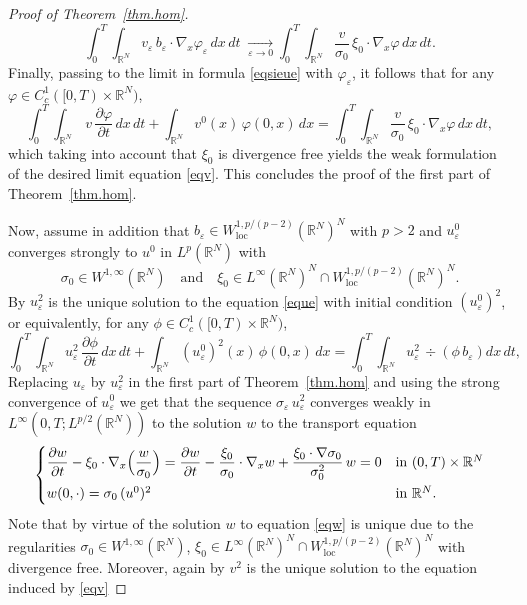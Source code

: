 \documentclass[11pt]{article}
\newcommand{\loc}{\mathrm{loc}}
\let \ph \varphi
\def \RR {\mathbb R}
\theoremstyle{plain}
\theoremstyle{definition}
\numberwithin{equation}{section}
\begin{document}
\begin{proof}[Proof of Theorem~\ref{thm.hom}]
\[
\int_0^T\!\!\int_{\RR^N}v_\varepsilon\,b_\varepsilon\cdot\nabla_x\ph_\varepsilon\,dx\,dt\;\xrightarrow[\varepsilon\to 0]\;
\int_0^T\!\!\int_{\RR^N}\dfrac{v}{\sigma_0}\,\xi_0\cdot\nabla_x\ph\,dx\,dt.
\]
Finally, passing to the limit in formula \eqref{eqsieue} with $\ph_\varepsilon$, it follows that for any $\ph\in C^1_c([0,T)\times\RR^N)$,
\[
\int_0^T\!\!\int_{\RR^N}\,v\, \dfrac{\partial\ph}{\partial t}\,dx\,dt+\int_{\RR^N}v^0(x)\,\ph(0,x)\,dx
=\int_0^T\!\!\int_{\RR^N} \dfrac{v}{\sigma_0}\,\xi_0\cdot\nabla_x\ph\,dx\,dt,
\]
which taking into account that $\xi_0$ is divergence free yields the weak formulation of the desired limit equation \eqref{eqv}.
This concludes the proof of the first part of Theorem~\ref{thm.hom}.

Now, assume in addition that $b_\varepsilon\in W^{1,p/(p-2)}_\loc(\RR^N)^N$ with $p>2$ and $u_\varepsilon^0$ converges strongly to $u^0$ in $L^p(\RR^N)$ with
\[
\sigma_0\in W^{1,\infty}(\RR^N)\quad\text{and}\quad \xi_0\in L^\infty(\RR^N)^N\cap W^{1,p/(p-2)}_\loc(\RR^N)^N.
\]
By \cite[Th.\,II.3 and Corollary\,II.1]{DiLi} $u_\varepsilon^2$ is the unique solution to the equation \eqref{eque} with initial condition $(u_\varepsilon^0)^2$, or equivalently, for any $\phi\in C^1_c([0,T)\times\RR^N)$,
\[
\int_0^T\!\!\int_{\RR^N}u_\varepsilon^2\, \dfrac{\partial\phi}{\partial t}\,dx\,dt+\int_{\RR^N}(u_\varepsilon^0)^2(x)\,\phi(0,x)\,dx=\int_0^T\!\!\int_{\RR^N}u_\varepsilon^2\,\div\left(\phi\,b_\varepsilon\right)dx\,dt,
\]
Replacing $u_\varepsilon$ by $u_\varepsilon^2$ in the first part of Theorem~\ref{thm.hom} and using the strong convergence of $u_\varepsilon^0$ we get that the sequence $\sigma_\varepsilon\,u_\varepsilon^2$ converges weakly in $L^\infty(0,T;L^{p/2}(\RR^N))$ to the solution $w$ to the transport equation
\begin{equation}\label{eqw}
\begin{cases}
\dfrac{\partial w}{\partial t}-\xi_0\cdot\nabla_x\Bigl(\dfrac{w}{\sigma_0}\Bigr)= \dfrac{\partial w}{\partial t}-\dfrac{\xi_0}{\sigma_0}\cdot\nabla_x w+ \dfrac{\xi_0\cdot\nabla\sigma_0}{\sigma_0^2}\,w=0
& \mbox{in }(0,T)\times\RR^N
\\[8pt]
w(0,\cdot)=\sigma_0\,(u^0)^2 & \mbox{in }\RR^N.
\end{cases}
\end{equation}
Note that by virtue of \cite[Cor.\,II.1]{DiLi} the solution $w$ to equation \eqref{eqw} is unique due to the regularities $\sigma_0\in W^{1,\infty}(\RR^N)$, $\xi_0\in L^\infty(\RR^N)^N\cap W^{1,p/(p-2)}_\loc(\RR^N)^N$ with divergence free. Moreover, again by \cite[Th.\,II.3 and Corollary\,II.1]{DiLi} $v^2$ is the unique solution to the equation induced by \eqref{eqv}

\end{proof}
\end{document}
